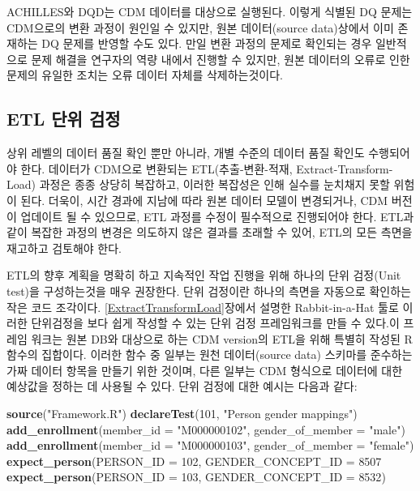 \documentclass[11pt]{book}
\newenvironment{Shaded}{\begin{snugshade}}{\end{snugshade}}
\newcommand{\KeywordTok}[1]{\textcolor[rgb]{0.13,0.29,0.53}{\textbf{#1}}}
\newcommand{\DataTypeTok}[1]{\textcolor[rgb]{0.13,0.29,0.53}{#1}}
\newcommand{\DecValTok}[1]{\textcolor[rgb]{0.00,0.00,0.81}{#1}}
\newcommand{\StringTok}[1]{\textcolor[rgb]{0.31,0.60,0.02}{#1}}
\newcommand{\NormalTok}[1]{#1}
\theoremstyle{definition}
\theoremstyle{definition}
\theoremstyle{definition}
\theoremstyle{remark}
\let\BeginKnitrBlock\begin \let\EndKnitrBlock\end
\begin{document}
\BeginKnitrBlock{rmdimportant}
ACHILLES와 DQD는 CDM 데이터를 대상으로 실행된다. 이렇게 식별된 DQ 문제는
CDM으로의 변환 과정이 원인일 수 있지만, 원본 데이터(source data)상에서
이미 존재하는 DQ 문제를 반영할 수도 있다. 만일 변환 과정의 문제로
확인되는 경우 일반적으로 문제 해결을 연구자의 역량 내에서 진행할 수
있지만, 원본 데이터의 오류로 인한 문제의 유일한 조치는 오류 데이터
자체를 삭제하는것이다.
\EndKnitrBlock{rmdimportant}

\subsection{ETL 단위 검정}\label{etlUnitTests}


상위 레벨의 데이터 품질 확인 뿐만 아니라, 개별 수준의 데이터 품질 확인도
수행되어야 한다. 데이터가 CDM으로 변환되는 ETL(추출-변환-적재,
Extract-Transform-Load) 과정은 종종 상당히 복잡하고, 이러한 복잡성은
인해 실수를 눈치채지 못할 위험이 된다. 더욱이, 시간 경과에 지남에 따라
원본 데이터 모델이 변경되거나, CDM 버전이 업데이트 될 수 있으므로, ETL
과정를 수정이 필수적으로 진행되어야 한다. ETL과 같이 복잡한 과정의
변경은 의도하지 않은 결과를 초래할 수 있어, ETL의 모든 측면을 재고하고
검토해야 한다.

ETL의 향후 계획을 명확히 하고 지속적인 작업 진행을 위해 하나의 단위
검정(Unit test)을 구성하는것을 매우 권장한다. 단위 검정이란 하나의
측면을 자동으로 확인하는 작은 코드 조각이다.
\ref{ExtractTransformLoad}장에서 설명한 Rabbit-in-a-Hat 툴로 이러한
단위검정을 보다 쉽게 작성할 수 있는 단위 검정 프레임워크를 만들 수
있다.이 프레임 워크는 원본 DB와 대상으로 하는 CDM version의 ETL을 위해
특별히 작성된 R 함수의 집합이다. 이러한 함수 중 일부는 원천
데이터(source data) 스키마를 준수하는 가짜 데이터 항목을 만들기 위한
것이며, 다른 일부는 CDM 형식으로 데이터에 대한 예상값을 정하는 데 사용될
수 있다. 단위 검정에 대한 예시는 다음과 같다:

\begin{Shaded}
\begin{Highlighting}[]
\KeywordTok{source}\NormalTok{(}\StringTok{"Framework.R"}\NormalTok{)}
\KeywordTok{declareTest}\NormalTok{(}\DecValTok{101}\NormalTok{, }\StringTok{"Person gender mappings"}\NormalTok{)}
\KeywordTok{add_enrollment}\NormalTok{(}\DataTypeTok{member_id =} \StringTok{"M000000102"}\NormalTok{, }\DataTypeTok{gender_of_member =} \StringTok{"male"}\NormalTok{)}
\KeywordTok{add_enrollment}\NormalTok{(}\DataTypeTok{member_id =} \StringTok{"M000000103"}\NormalTok{, }\DataTypeTok{gender_of_member =} \StringTok{"female"}\NormalTok{)}
\KeywordTok{expect_person}\NormalTok{(}\DataTypeTok{PERSON_ID =} \DecValTok{102}\NormalTok{, }\DataTypeTok{GENDER_CONCEPT_ID =} \DecValTok{8507}
\KeywordTok{expect_person}\NormalTok{(}\DataTypeTok{PERSON_ID =} \DecValTok{103}\NormalTok{, }\DataTypeTok{GENDER_CONCEPT_ID =} \DecValTok{8532}\NormalTok{)}
\end{Highlighting}
\end{Shaded}
\end{document}
